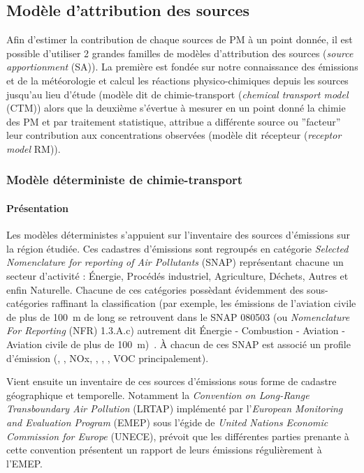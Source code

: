 \subsection{Modèle d'attribution des sources}%
\label{sec:source_apportionment_model}

Afin d'estimer la contribution de chaque sources de PM à un point donnée, il est possible
d'utiliser 2 grandes familles de modèles d'attribution des sources (\textit{source
apportionment} (SA)). La première est fondée sur notre connaissance des
émissions et de la météorologie et calcul les réactions physico-chimiques depuis les
sources jusqu'au lieu d'étude (modèle dit de chimie-transport (\textit{chemical transport
model} (CTM)) alors que la deuxième s'évertue à mesurer en un point donné
la chimie des PM et par traitement statistique, attribue a différente source ou
''facteur'' leur contribution aux concentrations observées (modèle dit récepteur
(\textit{receptor model} RM)).

\subsubsection{Modèle déterministe de chimie-transport}%
\label{ssub:modele_deterministe_de_chimietransport}

\paragraph{Présentation}%
\label{par:presentation}

Les modèles déterministes s'appuient sur l'inventaire des sources d'émissions sur la
région étudiée. Ces cadastres d'émissions sont regroupés en catégorie \textit{Selected
Nomenclature for reporting of Air Pollutants} (SNAP) représentant chacune un secteur
d'activité : Énergie, Procédés industriel, Agriculture, Déchets, Autres et enfin
Naturelle.
Chacune de ces catégories possèdant évidemment des sous-catégories raffinant la
classification (par exemple, les émissions de l'aviation civile de plus de \SI{100}{m} de
long se retrouvent dans le SNAP 080503 (ou \textit{Nomenclature For Reporting} (NFR)
1.3.A.c) autrement dit Énergie - Combustion - Aviation - Aviation civile de plus de
\SI{100}{m})~\autocite{europeanenvironmentagencyEMEP2019}.
À chacun de ces SNAP est associé un profile d'émission (, , NOx, , \PMdix, \PMdc,
VOC principalement).

Vient ensuite un inventaire de ces sources d'émissions sous forme de cadastre géographique
et temporelle. Notamment la \textit{Convention on Long-Range Transboundary Air
Pollution} (LRTAP) implémenté par l'\textit{European Monitoring and Evaluation Program}
(EMEP) sous l'égide de \textit{United Nations Economic Commission for Europe} (UNECE),
prévoit que les différentes parties prenante à cette convention présentent un rapport de
leurs émissions régulièrement à l'EMEP.


